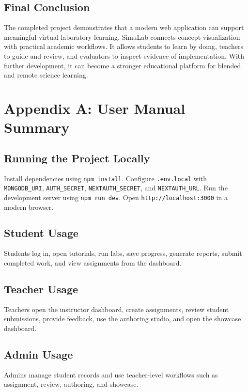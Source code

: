 \documentclass[12pt,a4paper]{report}
\begin{document}
\section{Final Conclusion}
The completed project demonstrates that a modern web application can support meaningful virtual laboratory learning. SimuLab connects concept visualization with practical academic workflows. It allows students to learn by doing, teachers to guide and review, and evaluators to inspect evidence of implementation. With further development, it can become a stronger educational platform for blended and remote science learning.

\appendix
\chapter{Appendix A: User Manual Summary}

\section{Running the Project Locally}
Install dependencies using \texttt{npm install}. Configure \texttt{.env.local} with \texttt{MONGODB\_URI}, \texttt{AUTH\_SECRET}, \texttt{NEXTAUTH\_SECRET}, and \texttt{NEXTAUTH\_URL}. Run the development server using \texttt{npm run dev}. Open \texttt{http://localhost:3000} in a modern browser.

\section{Student Usage}
Students log in, open tutorials, run labs, save progress, generate reports, submit completed work, and view assignments from the dashboard.

\section{Teacher Usage}
Teachers open the instructor dashboard, create assignments, review student submissions, provide feedback, use the authoring studio, and open the showcase dashboard.

\section{Admin Usage}
Admins manage student records and use teacher-level workflows such as assignment, review, authoring, and showcase.
\end{document}
